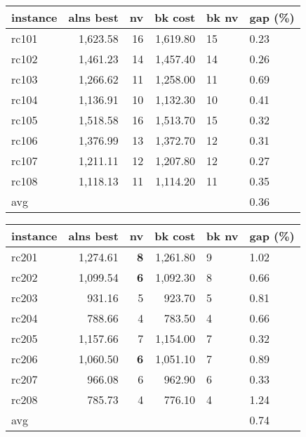   \begin{table}[caption={Kết quả đo với tập Solomon RC1}, label=exp:solomonRC1]
    \centering
    \begin{tabular}{lrrrll}
    \hline
    instance & \multicolumn{1}{l}{alns best} & \multicolumn{1}{l}{nv} & \multicolumn{1}{l}{bk cost} & bk nv & gap (\%) \\ \hline
    rc101 & 1,623.58 & 16 & 1,619.80 & 15 & 0.23 \\ 
    rc102 & 1,461.23 & 14 & 1,457.40 & 14 & 0.26 \\ \hline
    rc103 & 1,266.62 & 11 & 1,258.00 & 11 & 0.69 \\ \hline
    rc104 & 1,136.91 & 10 & 1,132.30 & 10 & 0.41 \\ \hline
    rc105 & 1,518.58 & 16 & 1,513.70 & 15 & 0.32 \\ \hline
    rc106 & 1,376.99 & 13 & 1,372.70 & 12 & 0.31 \\ \hline
    rc107 & 1,211.11 & 12 & 1,207.80 & 12 & 0.27 \\ \hline
    rc108 & 1,118.13 & 11 & 1,114.20 & 11 & 0.35 \\ \hline
    avg &  &  &  &  & 0.36 \\ \hline
    \end{tabular}
  \end{table}

  \begin{table}[caption={Kết quả đo với tập Solomon RC2}, label=exp:solomonRC2]
    \centering
    \begin{tabular}{lrrrll}
    \hline
    instance & \multicolumn{1}{l}{alns best} & \multicolumn{1}{l}{nv} & \multicolumn{1}{l}{bk cost} & bk nv & gap (\%) \\ \hline
    rc201 & 1,274.61 & \textbf{8} & 1,261.80 & 9 & 1.02 \\ 
    rc202 & 1,099.54 & \textbf{6} & 1,092.30 & 8 & 0.66 \\ \hline
    rc203 & 931.16 & 5 & 923.70 & 5 & 0.81 \\ \hline
    rc204 & 788.66 & 4 & 783.50 & 4 & 0.66 \\ \hline
    rc205 & 1,157.66 & 7 & 1,154.00 & 7 & 0.32 \\ \hline
    rc206 & 1,060.50 & \textbf{6} & 1,051.10 & 7 & 0.89 \\ \hline
    rc207 & 966.08 & 6 & 962.90 & 6 & 0.33 \\ \hline
    rc208 & 785.73 & 4 & 776.10 & 4 & 1.24 \\ \hline
    avg &  &  &  &  & 0.74 \\ \hline
    \end{tabular}
  \end{table}

